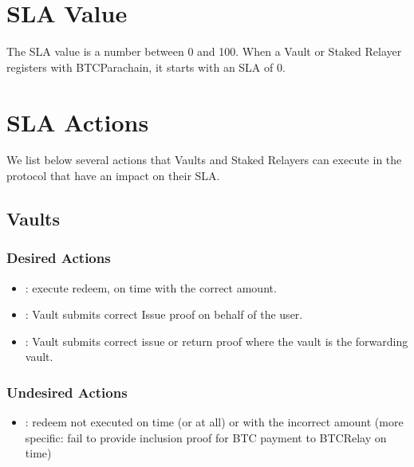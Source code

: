 \documentclass[a4paper,10pt,english]{sphinxmanual}
\begin{document}
\section{SLA Value}
\label{\detokenize{economics/SLA:sla-value}}
The SLA value is a number between 0 and 100. When a Vault or Staked Relayer registers with BTC\sphinxhyphen{}Parachain, it starts with an SLA of 0.


\section{SLA Actions}
\label{\detokenize{economics/SLA:sla-actions}}
We list below several actions that Vaults and Staked Relayers can execute in the protocol that have an impact on their SLA.


\subsection{Vaults}
\label{\detokenize{economics/SLA:vaults}}

\subsubsection{Desired Actions}
\label{\detokenize{economics/SLA:desired-actions}}\begin{itemize}
\item {} 
: execute redeem, on time with the correct amount.

\item {} 
: Vault submits correct Issue proof on behalf of the user.

\item {} 
: Vault submits correct issue or return proof where the vault is the forwarding vault.

\end{itemize}


\subsubsection{Undesired Actions}
\label{\detokenize{economics/SLA:undesired-actions}}\begin{itemize}
\item {} 
: redeem not executed on time (or at all) or with the incorrect amount (more specific: fail to provide inclusion proof for BTC payment to BTC\sphinxhyphen{}Relay on time)

\end{itemize}
\end{document}
